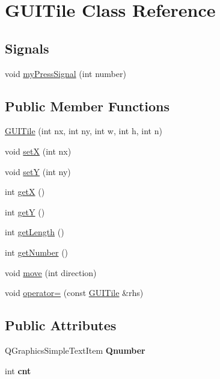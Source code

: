 \hypertarget{classGUITile}{\section{\-G\-U\-I\-Tile \-Class \-Reference}
\label{classGUITile}
}
\subsection*{\-Signals}
\begin{DoxyCompactItemize}
\item 
void \hyperlink{classGUITile_a2bac4f0555507c82afa2ef1304280006}{my\-Press\-Signal} (int number)
\end{DoxyCompactItemize}
\subsection*{\-Public \-Member \-Functions}
\begin{DoxyCompactItemize}
\item 
\hyperlink{classGUITile_af668a6a94375a0d18e31f4da3c398fa2}{\-G\-U\-I\-Tile} (int nx, int ny, int w, int h, int n)
\item 
void \hyperlink{classGUITile_a835186265d90bbf4e1b367557cc1dc2a}{set\-X} (int nx)
\item 
void \hyperlink{classGUITile_abf1cdc1adfd9ea9de6944cdd4794e437}{set\-Y} (int ny)
\item 
int \hyperlink{classGUITile_aa9bb3eaa1bcfe6032805593db8fb0a86}{get\-X} ()
\item 
int \hyperlink{classGUITile_a22c037d69a48973ea0f71caa65a28f4a}{get\-Y} ()
\item 
int \hyperlink{classGUITile_a013181636148bad1ced4e40d9c51ceda}{get\-Length} ()
\item 
int \hyperlink{classGUITile_a0d7d290c5c0f03b7a2d8493fe4e66bc3}{get\-Number} ()
\item 
void \hyperlink{classGUITile_a28b29a9e8990e36f7bf58ba0a13a47f4}{move} (int direction)
\item 
void \hyperlink{classGUITile_aec7dc019a373222a6350ee0e01f6ec5b}{operator=} (const \hyperlink{classGUITile}{\-G\-U\-I\-Tile} \&rhs)
\end{DoxyCompactItemize}
\subsection*{\-Public \-Attributes}
\begin{DoxyCompactItemize}
\item 
\hypertarget{classGUITile_adb41b8360befbd6f7b643aa95f837513}{\-Q\-Graphics\-Simple\-Text\-Item {\bfseries \-Qnumber}}\label{classGUITile_adb41b8360befbd6f7b643aa95f837513}

\item 
\hypertarget{classGUITile_a82d8f9782e4a85e1461d90338e857944}{int {\bfseries cnt}}\label{classGUITile_a82d8f9782e4a85e1461d90338e857944}

\end{DoxyCompactItemize}
